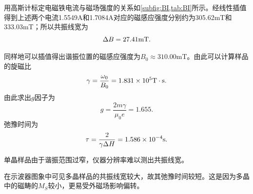	\par 用高斯计标定电磁铁电流与磁场强度的关系如\cref{subfig:BI,tab:BI}所示。经线性插值得到上述两个电流1.5549A和1.7084A对应的磁感应强度分别约为305.62mT和333.03mT；所以共振线宽为
	\begin{equation}
		\Delta B=27.41{\rm mT}.
	\end{equation}
	\par 同样地可以插值得出谐振位置的磁感应强度为$B_0\approx 310.00$mT。由此可以计算样品的旋磁比
	\begin{equation}
		\gamma =\dfrac{\omega_0}{B_0}=1.831\times 10^{5}{\rm T}\cdot{\rm s}.
	\end{equation}
	由此求出$g$因子为
	\begin{equation}
		g=\dfrac{2m\gamma}{\mu_0 e}=1.655.
	\end{equation}
	弛豫时间为
	\begin{equation}
		\tau = \dfrac{2}{\gamma \Delta H}=1.586\times 10^{-4}{\rm s}.
	\end{equation}
	\par 单晶样品由于谐振范围过窄，仪器分辨率难以测出共振线宽。
	\par 在示波器图象中可见多晶样品的共振线宽较大，故其弛豫时间较短。这是因为多晶中的磁畴的$M_{S}$较小，更易受外磁场影响偏转。
